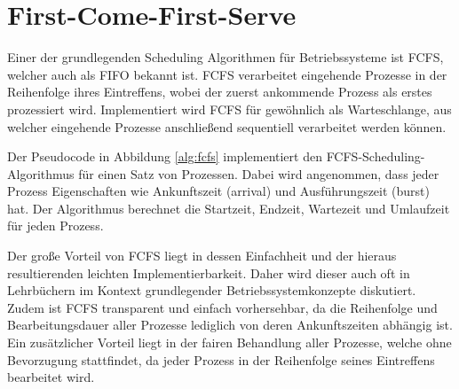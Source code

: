 

\section{First-Come-First-Serve}

Einer der grundlegenden Scheduling Algorithmen für Betriebssysteme ist \ac{FCFS}, welcher auch als \ac{FIFO} bekannt ist. \ac{FCFS} verarbeitet eingehende Prozesse in der Reihenfolge ihres Eintreffens, wobei der zuerst ankommende Prozess als erstes prozessiert wird. Implementiert wird \ac{FCFS} für gewöhnlich als Warteschlange, aus welcher eingehende Prozesse anschließend sequentiell verarbeitet werden können. 


Der Pseudocode in Abbildung \ref{alg:fcfs} implementiert den \ac{FCFS}-Scheduling-Algorithmus für einen Satz von Prozessen. Dabei wird angenommen, dass jeder Prozess Eigenschaften wie Ankunftszeit (arrival) und Ausführungszeit (burst) hat. Der Algorithmus berechnet die Startzeit, Endzeit, Wartezeit und Umlaufzeit für jeden Prozess. 

Der große Vorteil von \ac{FCFS} liegt in dessen Einfachheit und der hieraus resultierenden leichten Implementierbarkeit. Daher wird dieser auch oft in Lehrbüchern im Kontext grundlegender Betriebssystemkonzepte diskutiert. %
Zudem ist \ac{FCFS} transparent und einfach vorhersehbar, da die Reihenfolge und Bearbeitungsdauer aller Prozesse lediglich von deren Ankunftszeiten abhängig ist. Ein zusätzlicher Vorteil liegt in der fairen Behandlung aller Prozesse, welche ohne Bevorzugung stattfindet, da jeder Prozess in der Reihenfolge seines Eintreffens bearbeitet wird. %

